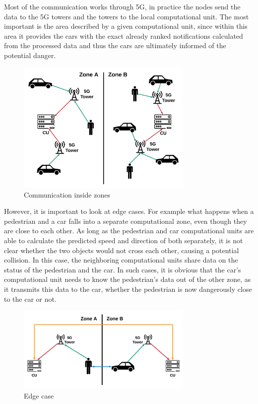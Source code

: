 \documentclass[conference]{IEEEtran}
\begin{document}
Most of the communication works through 5G, in practice the nodes send the data to the 5G towers and the towers to the local computational unit. The most important is the area described by a given computational unit, since within this area it provides the cars with the exact already ranked notifications calculated from the processed data and thus the cars are ultimately informed of the potential danger.

\begin{figure}[h]
    \centering
    \includegraphics[width=8.5cm]{./pics/Communication.png}
    \caption{Communication inside zones}
\end{figure}

However, it is important to look at edge cases. For example what happens when a pedestrian and a car falls into a separate computational zone, even though they are close to each other. As long as the pedestrian and car computational units are able to calculate the predicted speed and direction of both separately, it is not clear whether the two objects would not cross each other, causing a potential collision. In this case, the neighboring computational units share data on the status of the pedestrian and the car. In such cases, it is obvious that the car’s computational unit needs to know the pedestrian’s data out of the other zone, as it transmits this data to the car, whether the pedestrian is now dangerously close to the car or not.

\begin{figure}[h]
    \centering
    \includegraphics[width=8.5cm]{./pics/Edge case.png}
    \caption{Edge case}
\end{figure}
\end{document}
